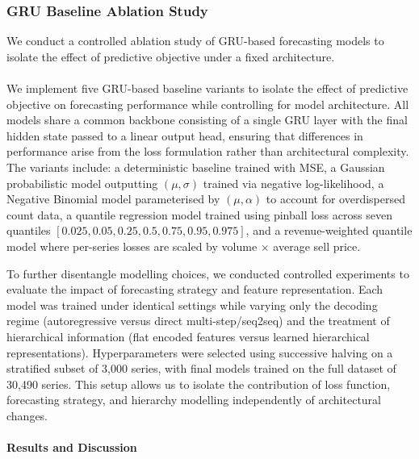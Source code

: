 \subsubsection{GRU Baseline Ablation Study}
We conduct a controlled ablation study of GRU-based forecasting models to isolate the effect of predictive objective under a fixed architecture.\\\\
We implement five GRU-based baseline variants to isolate the effect of predictive objective on forecasting performance while controlling for model architecture. All models share a common backbone consisting of a single GRU layer with the final hidden state passed to a linear output head, ensuring that differences in performance arise from the loss formulation rather than architectural complexity. The variants include: a deterministic baseline trained with MSE, a Gaussian probabilistic model outputting $(\mu, \sigma)$ trained via negative log-likelihood, a Negative Binomial model parameterised by $(\mu, \alpha)$ to account for overdispersed count data, a quantile regression model trained using pinball loss across seven quantiles $[0.025, 0.05, 0.25, 0.5, 0.75, 0.95, 0.975]$, and a revenue-weighted quantile model where per-series losses are scaled by volume $\times$ average sell price. 

To further disentangle modelling choices, we conducted controlled experiments to evaluate the impact of forecasting strategy and feature representation. Each model was trained under identical settings while varying only the decoding regime (autoregressive versus direct multi-step/seq2seq) and the treatment of hierarchical information (flat encoded features versus learned hierarchical representations). Hyperparameters were selected using successive halving on a stratified subset of 3,000 series, with final models trained on the full dataset of 30,490 series. This setup allows us to isolate the contribution of loss function, forecasting strategy, and hierarchy modelling independently of architectural changes.


\paragraph{Results and Discussion}



